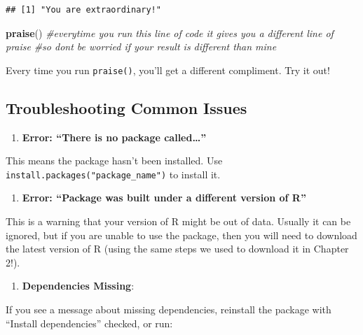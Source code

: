 \documentclass[
]{book}
\newenvironment{Shaded}{\begin{snugshade}}{\end{snugshade}}
\newcommand{\CommentTok}[1]{\textcolor[rgb]{0.56,0.35,0.01}{\textit{#1}}}
\newcommand{\FunctionTok}[1]{\textcolor[rgb]{0.13,0.29,0.53}{\textbf{#1}}}
\newcommand{\NormalTok}[1]{#1}
\providecommand{\tightlist}{%
  \setlength{\itemsep}{0pt}\setlength{\parskip}{0pt}}
\begin{document}
\begin{verbatim}
## [1] "You are extraordinary!"
\end{verbatim}

\begin{Shaded}
\begin{Highlighting}[]
\FunctionTok{praise}\NormalTok{() }\CommentTok{\#everytime you run this line of code it gives you a different line of praise}
\CommentTok{\#so don\textquotesingle{}t be worried if your result is different than mine}
\end{Highlighting}
\end{Shaded}

Every time you run \texttt{praise()}, you'll get a different compliment. Try it out!

\subsection{Troubleshooting Common Issues}\label{troubleshooting-common-issues}

\begin{enumerate}
\def\labelenumi{\arabic{enumi}.}
\tightlist
\item
  \textbf{Error: ``There is no package called\ldots{}''}
\end{enumerate}

This means the package hasn't been installed. Use \texttt{install.packages("package\_name")} to install it.

\begin{enumerate}
\def\labelenumi{\arabic{enumi}.}
\setcounter{enumi}{1}
\tightlist
\item
  \textbf{Error: ``Package was built under a different version of R''}
\end{enumerate}

This is a warning that your version of R might be out of data. Usually it can be ignored, but if you are unable to use the package, then you will need to download the latest version of R (using the same steps we used to download it in Chapter 2!).

\begin{enumerate}
\def\labelenumi{\arabic{enumi}.}
\setcounter{enumi}{2}
\tightlist
\item
  \textbf{Dependencies Missing}:
\end{enumerate}

If you see a message about missing dependencies, reinstall the package with ``Install dependencies'' checked, or run:
\end{document}
